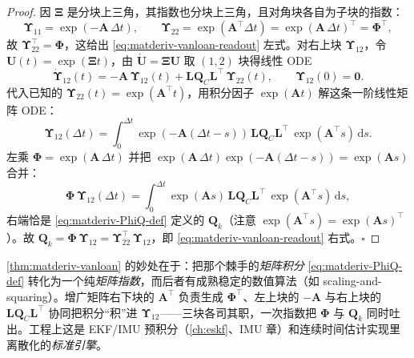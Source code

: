 \begin{proof}
因 $\boldsymbol{\Xi}$ 是分块上三角，其指数也分块上三角，且对角块各自为子块的指数：
\begin{equation*}
  \boldsymbol{\Upsilon}_{11}=\exp(-\mathbf{A}\,\Delta t),\qquad
  \boldsymbol{\Upsilon}_{22}=\exp(\mathbf{A}^\top\Delta t)=\exp(\mathbf{A}\,\Delta t)^\top=\boldsymbol{\Phi}^\top,
\end{equation*}
故 $\boldsymbol{\Upsilon}_{22}^\top=\boldsymbol{\Phi}$，这给出 \cref{eq:matderiv-vanloan-readout} 左式。对右上块 $\boldsymbol{\Upsilon}_{12}$，令 $\mathbf{U}(t)=\exp(\boldsymbol{\Xi}t)$，由 $\dot{\mathbf{U}}=\boldsymbol{\Xi}\mathbf{U}$ 取 $(1,2)$ 块得线性 ODE
\begin{equation*}
  \dot{\boldsymbol{\Upsilon}}_{12}(t)=-\mathbf{A}\,\boldsymbol{\Upsilon}_{12}(t)+\mathbf{L}\mathbf{Q}_C\mathbf{L}^\top\,\boldsymbol{\Upsilon}_{22}(t),\qquad \boldsymbol{\Upsilon}_{12}(0)=\mathbf{0}.
\end{equation*}
代入已知的 $\boldsymbol{\Upsilon}_{22}(t)=\exp(\mathbf{A}^\top t)$，用积分因子 $\exp(\mathbf{A}t)$ 解这条一阶线性矩阵 ODE：
\begin{equation*}
  \boldsymbol{\Upsilon}_{12}(\Delta t)=\int_0^{\Delta t}\exp(-\mathbf{A}(\Delta t-s))\,\mathbf{L}\mathbf{Q}_C\mathbf{L}^\top\,\exp(\mathbf{A}^\top s)\,\mathrm{d}s.
\end{equation*}
左乘 $\boldsymbol{\Phi}=\exp(\mathbf{A}\,\Delta t)$ 并把 $\exp(\mathbf{A}\,\Delta t)\exp(-\mathbf{A}(\Delta t-s))=\exp(\mathbf{A}s)$ 合并：
\begin{equation*}
  \boldsymbol{\Phi}\,\boldsymbol{\Upsilon}_{12}(\Delta t)
  =\int_0^{\Delta t}\exp(\mathbf{A}s)\,\mathbf{L}\mathbf{Q}_C\mathbf{L}^\top\,\exp(\mathbf{A}^\top s)\,\mathrm{d}s,
\end{equation*}
右端恰是 \cref{eq:matderiv-PhiQ-def} 定义的 $\mathbf{Q}_k$（注意 $\exp(\mathbf{A}^\top s)=\exp(\mathbf{A}s)^\top$）。故 $\mathbf{Q}_k=\boldsymbol{\Phi}\,\boldsymbol{\Upsilon}_{12}=\boldsymbol{\Upsilon}_{22}^\top\,\boldsymbol{\Upsilon}_{12}$，即 \cref{eq:matderiv-vanloan-readout} 右式。\hfill$\square$
\end{proof}

\begin{insight}
\cref{thm:matderiv-vanloan} 的妙处在于：把那个棘手的\emph{矩阵积分} \cref{eq:matderiv-PhiQ-def} 转化为一个纯\emph{矩阵指数}，而后者有成熟稳定的数值算法（如 scaling-and-squaring）。增广矩阵右下块的 $\mathbf{A}^\top$ 负责生成 $\boldsymbol{\Phi}^\top$、左上块的 $-\mathbf{A}$ 与右上块的 $\mathbf{L}\mathbf{Q}_C\mathbf{L}^\top$ 协同把积分“积”进 $\boldsymbol{\Upsilon}_{12}$——三块各司其职，一次指数把 $\boldsymbol{\Phi}$ 与 $\mathbf{Q}_k$ 同时吐出。工程上这是 EKF/IMU 预积分（\cref{ch:eskf}、IMU 章）和连续时间估计实现里离散化的\emph{标准引擎}。
\end{insight}

